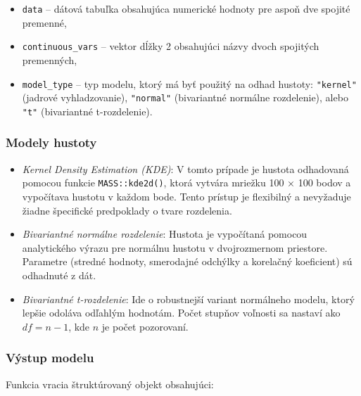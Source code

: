 \begin{itemize}
\setlength{\itemsep}{0pt}
  \setlength{\parskip}{0pt}
  \item \texttt{data} – dátová tabuľka obsahujúca numerické hodnoty pre aspoň dve spojité premenné,
  \item \texttt{continuous\_vars} – vektor dĺžky 2 obsahujúci názvy dvoch spojitých premenných,
  \item \texttt{model\_type} – typ modelu, ktorý má byť použitý na odhad hustoty: \texttt{"kernel"} (jadrové vyhladzovanie), \texttt{"normal"} (bivariantné normálne rozdelenie), alebo \texttt{"t"} (bivariantné t-rozdelenie).
\end{itemize}

\subsubsection{Modely hustoty}

\begin{itemize}
\setlength{\itemsep}{0pt}
  \setlength{\parskip}{0pt}
  \item \textit{Kernel Density Estimation (KDE)}:  
  V tomto prípade je hustota odhadovaná pomocou funkcie \texttt{MASS::kde2d()}, ktorá vytvára mriežku 100 × 100 bodov a vypočítava hustotu v každom bode. Tento prístup je flexibilný a nevyžaduje žiadne špecifické predpoklady o tvare rozdelenia.

  \item \textit{Bivariantné normálne rozdelenie}:  
  Hustota je vypočítaná pomocou analytického výrazu pre normálnu hustotu v dvojrozmernom priestore. Parametre (stredné hodnoty, smerodajné odchýlky a korelačný koeficient) sú odhadnuté z dát.

  \item \textit{Bivariantné t-rozdelenie}:  
  Ide o robustnejší variant normálneho modelu, ktorý lepšie odoláva odľahlým hodnotám. Počet stupňov voľnosti sa nastaví ako $df = n - 1$, kde $n$ je počet pozorovaní.
\end{itemize}

\subsubsection{Výstup modelu}

Funkcia vracia štruktúrovaný objekt obsahujúci:

